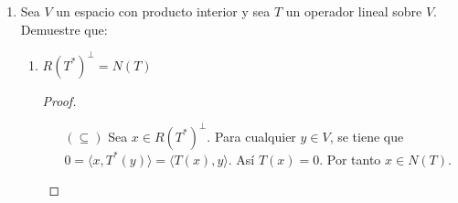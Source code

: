 \documentclass[letterpaper]{article}
\newtheorem*{sol}{Solución}
\begin{document}
\begin{enumerate}
\begin{sol}
\begin{itemize}
    \item Se sigue que,
    \[
        v_3 = 1 - \frac{\langle v_1, 1 \rangle}{\| v_1 \|^2}v_1 -
            \frac{\langle v_2, 1 \rangle}{\| v_1 \|^2}v_1
        = 1 - \frac{4\sin(t)}{\pi}
    \]
    Donde
    \[
        \langle v_1, 1 \rangle = \int_0^\pi \sin(t)dt = 2
        ,\quad
        \langle v_2, 1 \rangle = \int_0^\pi \cos(t)dt = 0
    \]
    Entonces $\| v_3\|^2 = \pi - \frac{8}{\pi}$.

    \item Por consiguiente,
    \[
        v_4 = t - \frac{\langle v_1, t \rangle}{\| v_1 \|^2}v_1 -
            \frac{\langle v_2, t \rangle}{\| v_2 \|^2}v_2 -
            \frac{\langle v_3, t \rangle}{\| v_3 \|^2}v_3
        = t + \frac{4\cos(t)}{\pi} - \frac{\pi}{2}
    \]
    Donde
    \[
        \langle v_1, t \rangle = \int_0^\pi \sin(t)dt = 2
        ,\quad
        \langle v_2, t \rangle = \int_0^\pi \cos(t)dt = 0
        ,\quad
        \langle v_3, t \rangle = \int_0^\pi \cos(t)dt = 0
    \]
    Entonces $\| v_4\|^2 = \frac{\pi^4 - 96}{12\pi}$.
\end{itemize}

Concluyendo así que $\{ v_1,v_2,v_3,v_4 \}$ es una base ortogonal para $V$.

Para obtener una base ortonormal, normalizamos $v_1, v_2, v_3$ y $v_4$ para obtenerl\footnote{Me apoye con la
herramienta \url{https://www.wolframalpha.com/} para las operaciones.}
\[
    u_1 = \frac{v_1}{\| v_1 \|} = \frac{\sin(t)}{\sqrt{\frac{\pi}{2}}}
        = \sqrt{\frac{2}{\pi}} \sin(t)
\]

\[
    u_2 = \frac{v_2}{\| v_2\|} = \frac{\cos(t)}{\sqrt{\frac{\pi}{2}}}
    = \sqrt{\frac{2}{\pi}} \cos(t)
\]

\[
    u_3 = \frac{v_3}{\| v_3\|} = \frac{1 - \frac{4\sin(t)}{\pi}}{\sqrt{\pi - \frac{8}{\pi}}}
        = \frac{\pi - 4\sin(t)}{\sqrt{\pi(\pi^2 - 8)}}
\]

\[
    u_4 = \frac{v_4}{\| v_4\|} = \frac{t + \frac{4\cos(t)}{\pi} - \frac{\pi}{2}}{\sqrt{\frac{\pi^4 - 96}{12\pi}}}
        = \sqrt{\frac{3}{\pi(\pi^4 - 96)}} (\pi (2t - \pi) + 8\cos(t))
\]

Teniendo así $\{u_1, u_2, u_3, u_4 \}$ la base ortonormal deseada para $V$.
\end{sol}

\item Sea $V$ un espacio con producto interior y sea $T$ un operador lineal sobre $V$. Demuestre que:

\begin{enumerate}[label=(\alph*)]
    \item $R(T^*)^\bot = N(T)$
    \begin{proof}\hfill
    \begin{itemize}
        \item[$(\subseteq)$] Sea $x \in R(T^*)^\bot$. Para cualquier $y \in V$, se tiene que
        $0 = \langle x, T^*(y)\rangle = \langle T(x), y \rangle$. Así $T(x) = 0$. Por tanto $x \in N(T)$.


\end{itemize}
\end{proof}
\end{enumerate}
\end{enumerate}
\end{document}
